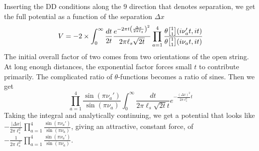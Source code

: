 \documentclass[11pt, class=article, crop=false]{standalone}
\begin{document}
\begin{enumerate}
	Inserting the DD conditions along the $9$ direction that denotes separation, we get the full potential  as a function of the separation $\Delta x$
	\begin{equation}\label{eq:partitionfunc}
		V = - 2 \times \int_0^\infty \frac{dt}{2t} \frac{e^{-2 \pi t \left( \frac{\Delta x}{2\pi \ell_s} \right)^2}}{2\pi \ell_s \sqrt{2t}} \prod_{a=1}^4 \frac{\theta \twist11 (i \nu'_a t, i t)}{\theta \twist11 (i \nu_a t, i t)}
	\end{equation}
	The initial overall factor of two comes from two orientations of the open string.
	At long enough distances, the exponential factor forces small $t$ to contribute primarily. The complicated ratio of $\theta$-functions becomes a ratio of sines. Then we get
	\[
		\prod_{a=1}^4 \frac{\sin(\pi \nu_a')}{\sin(\pi \nu_a)} \int_0^\infty \frac{dt}{2 \pi \ell_s \sqrt{2 t} t} e^{- \frac{(\Delta x)^2}{2\pi \ell_s^2} t}
	\]
	Taking the integral and analytically continuing, we get a potential that looks like $- \frac{|\Delta x|}{2 \pi \ell_s^2} \prod_{a=1}^4 \frac{\sin(\pi \nu_a')}{\sin(\pi \nu_a)}$, giving an attractive, constant force, of $-\frac{1}{2 \pi \ell_s^2} \prod_{a=1}^4 \frac{\sin(\pi \nu_a')}{\sin(\pi \nu_a)}$.
	

\end{enumerate}
\end{document}

